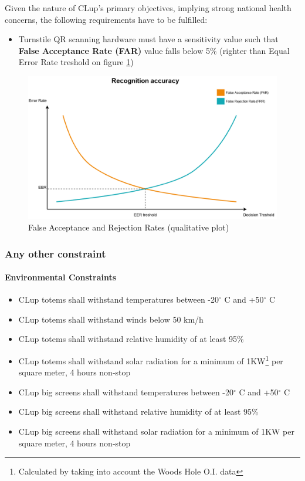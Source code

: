 Given the nature of CLup's primary objectives, implying strong national health concerns, the following requirements have to be fulfilled:\newline
\begin{itemize}[leftmargin=+.8in]
    \item[\ref{subsub:hwLimit}.1] Turnstile QR scanning hardware must have a sensitivity value such that \textbf{False Acceptance Rate (FAR)} value falls below 5\% (righter than Equal Error Rate treshold on figure \ref{fig:FAR})
\end{itemize}
\begin{figure}
	\includegraphics[width=\linewidth]{../Diagrams/FAR.png}
	\caption{False Acceptance and Rejection Rates (qualitative plot)}
	\label{fig:FAR}
\end{figure}

\subsubsection{Any other constraint}
\paragraph{Environmental Constraints}
\label{par:envConstraints}
\begin{itemize}[leftmargin=+.8in]
    \item[\ref{par:envConstraints}.1.1] CLup totems shall withstand temperatures between -20$^{\circ}$ C and +50$^{\circ}$ C
    \item[\ref{par:envConstraints}.1.2] CLup totems shall withstand winds below 50 km/h
    \item[\ref{par:envConstraints}.1.3] CLup totems shall withstand relative humidity of at least 95\% 
    \item[\ref{par:envConstraints}.1.4] CLup totems shall withstand solar radiation for a minimum of 1KW\footnote{Calculated by taking into account the Woods Hole O.I. data\cite{Solar:Radiation}} per square meter, 4 hours non-stop
    \item[\ref{par:envConstraints}.1.5] CLup big screens shall withstand temperatures between -20$^{\circ}$ C and +50$^{\circ}$ C
    \item[\ref{par:envConstraints}.1.6] CLup big screens shall withstand relative humidity of at least 95\%
    \item[\ref{par:envConstraints}.1.7] CLup big screens shall withstand solar radiation for a minimum of 1KW per square meter, 4 hours non-stop
\end{itemize}
\bigskip
